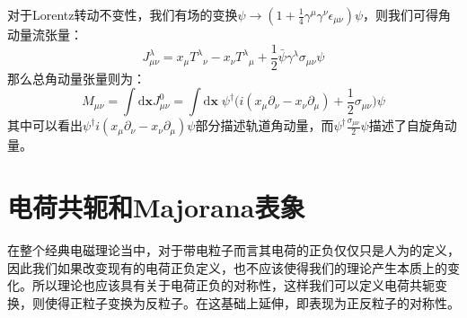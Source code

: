 对于Lorentz转动不变性，我们有场的变换$\psi\rightarrow(1+\frac{1}{4}\gamma^\mu\gamma^\nu\epsilon_{\mu\nu})\psi$，则我们可得角动量流张量：
\begin{equation}
J^\lambda_{\mu\nu}=x_\mu{T^\lambda}_\nu-x_\nu{T^\lambda}_\mu+\frac{1}{2}\bar{\psi}\gamma^\lambda\sigma_{\mu\nu}\psi
\end{equation}
那么总角动量张量则为：
\begin{equation}
M_{\mu\nu}=\int\mathrm{d}\boldsymbol{x}J^0_{\mu\nu}=\int\mathrm{d}\boldsymbol{x}\;\psi^\dagger\Big(i(x_\mu\partial_\nu-x_\nu\partial_\mu)+\frac{1}{2}\sigma_{\mu\nu}\Big)\psi
\end{equation}
其中可以看出$\psi^\dagger i(x_\mu\partial_\nu-x_\nu\partial_\mu)\psi$部分描述轨道角动量，而$\psi^\dagger\frac{\sigma_{\mu\nu}}{2}\psi$描述了自旋角动量。

\section{电荷共轭和Majorana表象}
在整个经典电磁理论当中，对于带电粒子而言其电荷的正负仅仅只是人为的定义，因此我们如果改变现有的电荷正负定义，也不应该使得我们的理论产生本质上的变化。所以理论也应该具有关于电荷正负的对称性，这样我们可以定义电荷共轭变换，则使得正粒子变换为反粒子。在这基础上延伸，即表现为正反粒子的对称性。

